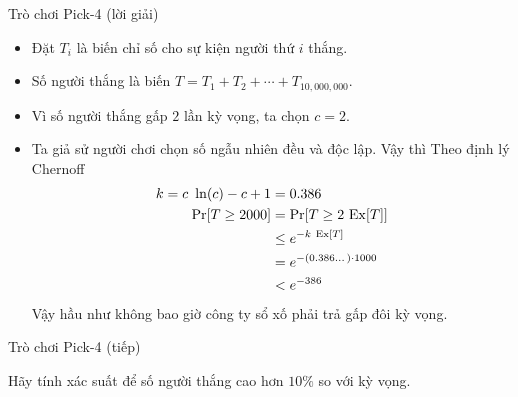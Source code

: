 \begin{frame}[t]{Trò chơi Pick-4 (lời giải)}
	\begin{itemize}
		
		\item<+-> Đặt $T_i$ là biến chỉ số cho sự kiện người thứ $i$ thắng.
		\item<+-> Số người thắng là biến $	T = T_1 + T_2 + \cdots + T_{10,000,000}$.

		\item<+-> Vì số người thắng gấp $2$ lần kỳ vọng, ta chọn $c = 2$.
		
		\item<+-> Ta giả sử người chơi chọn số ngẫu nhiên đều và  độc lập. Vậy thì   Theo định lý Chernoff
		\begin{align*}
			k = c\ \ln(c) - c + 1 &= 0.386 \\
			\mathrm{Pr}[T \geq 2000] &= \mathrm{Pr}[T \geq 2\ \mathrm{Ex}[T]] \\
			                 &\leq e^{-k\ \mathrm{Ex}[T]} \\
							 &=e^{-(0.386\dots)\cdot 1000}\\
							 &< e^{-386}
		\end{align*}  
		Vậy hầu như không bao giờ công ty sổ xố phải trả gấp đôi kỳ vọng.
	\end{itemize}
\end{frame}

\begin{frame}{Trò chơi Pick-4 (tiếp)}
\begin{xrcs}
			Hãy tính xác suất để số người thắng  cao hơn $10\%$ so với kỳ vọng.
\end{xrcs}
\end{frame}

